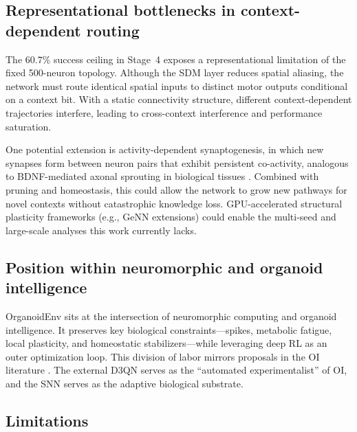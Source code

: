 \documentclass[journal,twocolumn]{IEEEtran}
\begin{document}
\subsection{Representational bottlenecks in context-dependent
routing}\label{sec:bottleneck}

The 60.7\% success ceiling in Stage~4 exposes a representational
limitation of the fixed 500-neuron topology.  Although the SDM layer
reduces spatial aliasing, the network must route identical spatial
inputs to distinct motor outputs conditional on a context bit.  With
a static connectivity structure, different context-dependent
trajectories interfere, leading to cross-context interference and
performance saturation.

One potential extension is activity-dependent synaptogenesis, in which
new synapses form between neuron pairs that exhibit persistent
co-activity, analogous to BDNF-mediated axonal sprouting in biological
tissues \cite{eLifeHomeostatic2025}.  Combined with pruning and
homeostasis, this could allow the network to grow new pathways for
novel contexts without catastrophic knowledge loss.  GPU-accelerated
structural plasticity frameworks (e.g., GeNN extensions) could enable
the multi-seed and large-scale analyses this work currently lacks.

\subsection{Position within neuromorphic and organoid intelligence}

OrganoidEnv sits at the intersection of neuromorphic computing and
organoid intelligence.  It preserves key biological
constraints---spikes, metabolic fatigue, local plasticity, and
homeostatic stabilizers---while leveraging deep RL as an outer
optimization loop.  This division of labor mirrors proposals in the
OI literature \cite{Smirnova2023OI,Hartung2023OIworkshop,Xiong2024BridgingAI}.
The external D3QN serves as the ``automated experimentalist'' of OI,
and the SNN serves as the adaptive biological substrate.

\subsection{Limitations}
\end{document}

